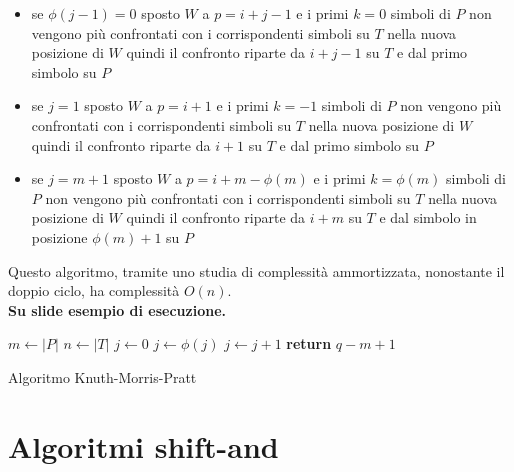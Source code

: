 \documentclass[a4paper,12pt, oneside]{book}
\begin{document}
\begin{itemize}
  \item se $\phi(j-1)=0$ sposto $W$ a $p=i+j-1$ e i primi $k=0$ simboli di $P$
  non vengono più confrontati con i corrispondenti simboli su $T$ nella nuova
  posizione di $W$ quindi il confronto riparte da $i+j-1$ su $T$ e dal primo
  simbolo su $P$
  \item se $j=1$ sposto $W$ a $p=i+1$ e i primi $k=-1$ simboli di $P$
  non vengono più confrontati con i corrispondenti simboli su $T$ nella nuova
  posizione di $W$ quindi il confronto riparte da $i+1$ su $T$ e dal primo
  simbolo su $P$
  \item se $j=m+1$ sposto $W$ a $p=i+m-\phi(m)$ e i primi $k=\phi(m)$ simboli di
  $P$ 
  non vengono più confrontati con i corrispondenti simboli su $T$ nella nuova
  posizione di $W$ quindi il confronto riparte da $i+m$ su $T$ e dal 
  simbolo in posizione $\phi(m)+1$ su $P$
\end{itemize}

Questo algoritmo, tramite uno studia di complessità ammortizzata, nonostante il
doppio ciclo, ha complessità $O(n)$.\\
\textbf{Su slide esempio di esecuzione.}
\begin{algorithm}
  \begin{algorithmic}
    \State $m\gets |P|$
    \State $n\gets |T|$
    \State $j\gets 0$
    \State $j \gets \phi(j)$
    \EndWhile
    \State $j\gets j+1$
    \State \textbf{return} $q-m+1$
    \EndIf
    \EndFor   
    \EndFunction
  \end{algorithmic}
  \caption{Algoritmo Knuth-Morris-Pratt}
\end{algorithm}
\section{Algoritmi shift-and}
\end{document}

